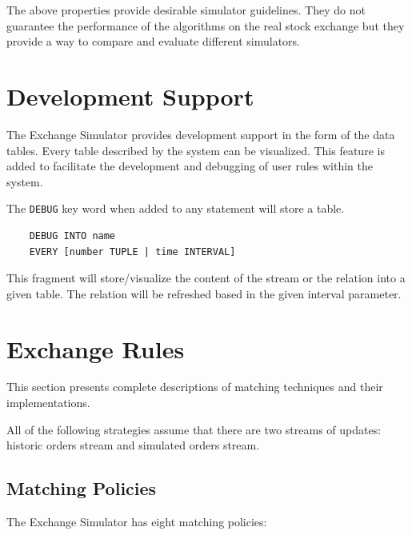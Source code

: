 \documentclass{article}
\begin{document}
The above properties provide desirable simulator guidelines. They do not guarantee the performance of the algorithms on the real stock exchange but they provide a way to compare and evaluate different simulators.

\section{Development Support}

The Exchange Simulator provides development support in the form of the data tables. Every table described by the system can be visualized. This feature is added to facilitate the development and debugging of user rules within the system. 

The {\tt DEBUG} key word when added to any statement will store a table.

\begin{verbatim}
    DEBUG INTO name
    EVERY [number TUPLE | time INTERVAL] 
\end{verbatim} 

This fragment will store/visualize the content of the stream or the relation into a given table. The relation will be refreshed based in the given interval parameter.

\section{Exchange Rules}

This section presents complete descriptions of matching techniques and their implementations. 

All of the following strategies assume that there are two streams of updates: historic orders stream and simulated orders stream.

\subsection{Matching Policies}

The Exchange Simulator has eight matching policies:
\end{document}
